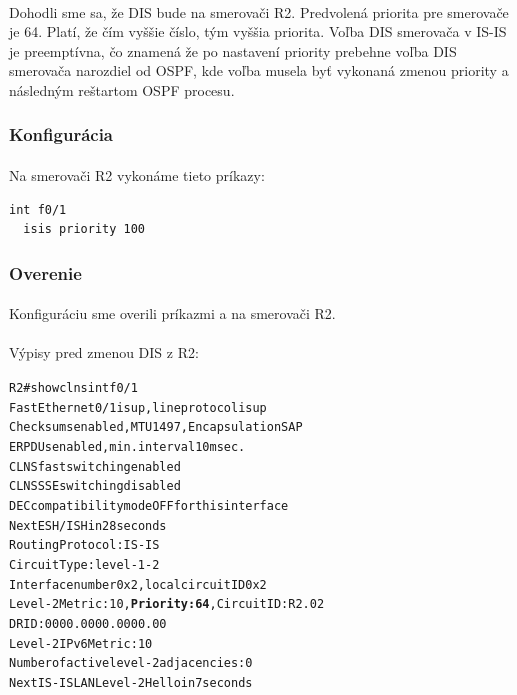 \documentclass[12pt,twoside,a4paper]{report}
\begin{document}
\paragraph{}
Dohodli sme sa, že DIS bude na smerovači R2. Predvolená priorita pre smerovače je 64. Platí, že čím vyššie číslo, tým vyššia priorita. Voľba DIS smerovača v IS-IS je preemptívna, čo znamená že  po nastavení priority prebehne voľba DIS smerovača narozdiel od OSPF, kde voľba musela byť vykonaná zmenou priority a následným reštartom OSPF procesu.

\subsubsection{Konfigurácia}
\paragraph{}
Na smerovači R2 vykonáme tieto príkazy:
\noindent
{\selectfont
\begin{small}
\begin{verbatim}
int f0/1
  isis priority 100
\end{verbatim}
\end{small}
}

\subsubsection{Overenie}
\paragraph{}
Konfiguráciu sme overili príkazmi  a  na smerovači R2.

\paragraph{}
Výpisy pred zmenou DIS z R2:

\noindent
{\selectfont
\begin{small}
\begin{alltt}
R2#show clns int f0/1
FastEthernet0/1 is up, line protocol is up
  Checksums enabled, MTU 1497, Encapsulation SAP
  ERPDUs enabled, min. interval 10 msec.
  CLNS fast switching enabled
  CLNS SSE switching disabled
  DEC compatibility mode OFF for this interface
  Next ESH/ISH in 28 seconds
  Routing Protocol: IS-IS
    Circuit Type: level-1-2
    Interface number 0x2, local circuit ID 0x2
    Level-2 Metric: 10, \textbf{Priority: 64}, Circuit ID: R2.02
    DR ID: 0000.0000.0000.00
    Level-2 IPv6 Metric: 10
    Number of active level-2 adjacencies: 0
    Next IS-IS LAN Level-2 Hello in 7 seconds

\end{alltt}
\end{small}
}
\end{document}
